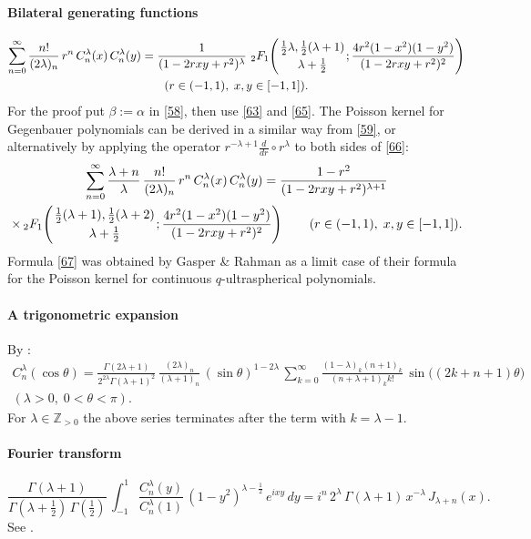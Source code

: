 \documentclass[twoside,11pt]{article}
\newcommand\ZZ{\mathbb{Z}}
\newcommand\al\alpha
\newcommand\be\beta
\newcommand\tha\theta
\newcommand\la\lambda
\newcommand\Ga{\Gamma}
\newcommand\half{\frac12}
\newcommand\thalf{\tfrac12}
\newcommand\iy\infty
\newcommand\Zpos{\ZZ_{>0}}
\newcommand{\hyp}[5]{\,\mbox{}_{#1}F_{#2}\!\left(
  \genfrac{}{}{0pt}{}{#3}{#4};#5\right)}
\begin{document}
\paragraph{Bilateral generating functions}
\begin{multline}
\sum_{n=0}^\iy\frac{n!}{(2\la)_n}\,r^n\,C_n^\la(x)\,C_n^\la(y)
=\frac1{(1-2rxy+r^2)^\la}\,\hyp21{\thalf\la,\thalf(\la+1)}{\la+\thalf}
{\frac{4r^2(1-x^2)(1-y^2)}{(1-2rxy+r^2)^2}}\\
(r\in(-1,1),\;x,y\in[-1,1]).
\label{66}
\end{multline}
For the proof put $\be:=\al$ in \eqref{58}, then use \eqref{63} and \eqref{65}.
The Poisson kernel for Gegenbauer polynomials can be derived in a similar way
from \eqref{59}, or alternatively by applying the operator
$r^{-\la+1}\frac d{dr}\circ r^\la$ to both sides of \eqref{66}:
\begin{multline}
\sum_{n=0}^\iy\frac{\la+n}\la\,\frac{n!}{(2\la)_n}\,r^n\,C_n^\la(x)\,C_n^\la(y)
=\frac{1-r^2}{(1-2rxy+r^2)^{\la+1}}\\
\times\hyp21{\thalf(\la+1),\thalf(\la+2)}{\la+\thalf}
{\frac{4r^2(1-x^2)(1-y^2)}{(1-2rxy+r^2)^2}}\qquad
(r\in(-1,1),\;x,y\in[-1,1]).
\label{67}
\end{multline}
Formula \eqref{67} was obtained by Gasper \& Rahman \cite[(4.4)]{234}
as a limit case of their formula for the Poisson kernel for continuous
$q$-ultraspherical polynomials.
%
\paragraph{A trigonometric expansion}
By \cite[(14.13.1), (14.3.21), (5.5.5)]{DLMF}:
\begin{align}
C_n^\la(\cos\tha)=\frac{\Ga(2\la+1)}{2^{2\la}\Ga(\la+1)^2}\,
\frac{(2\la)_n}{(\la+1)_n}\,(\sin\tha)^{1-2\la}\,
\sum_{k=0}^\iy\frac{(1-\la)_k(n+1)_k}{(n+\la+1)_k k!}\,
\sin\big((2k+n+1)\tha\big)
\label{7}\\
(\la>0,\;0<\tha<\pi).
\nonumber
\end{align}
For $\la\in\Zpos$ the above series terminates after the term with
$k=\la-1$.
%
\paragraph{Fourier transform}
\begin{equation}
\frac{\Ga(\la+1)}{\Ga(\la+\thalf)\,\Ga(\thalf)}\,
\int_{-1}^1 \frac{C_n^\la(y)}{C_n^\la(1)}\,(1-y^2)^{\la-\half}\,
e^{ixy}\,dy
=i^n\,2^\la\,\Ga(\la+1)\,x^{-\la}\,J_{\la+n}(x).
\label{8}
\end{equation}
See \cite[(18.17.17) and (18.17.18)]{DLMF}.
%
\end{document}
